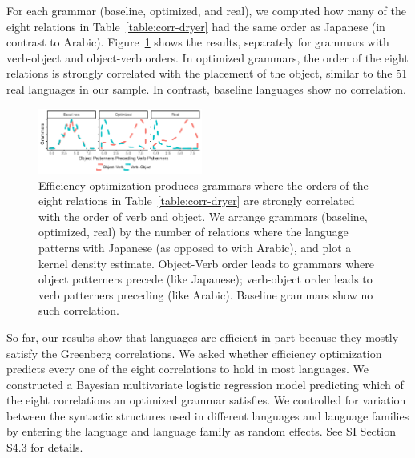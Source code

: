 \documentclass[9pt,twocolumn,twoside,lineno]{pnas-new}
\begin{document}
For each grammar (baseline, optimized, and real), we computed how many of the eight relations in Table~\ref{table:corr-dryer} had the same order as  Japanese (in contrast to Arabic).
Figure~\ref{fig:joint} shows the results, separately for grammars with verb-object and object-verb orders.
In optimized grammars, the order of the eight relations is strongly correlated with the placement of the object, similar to the 51 real languages in our sample.
In contrast, baseline languages show no correlation.


\begin{figure}
    \centering
    \includegraphics[width=0.48\textwidth]{../results/correlations/figures/correlations-curve-whiteaxis.pdf}
    \caption{
    Efficiency optimization produces grammars where the orders of the eight relations in Table~\ref{table:corr-dryer} are strongly correlated with the order of verb and object. We arrange grammars (baseline, optimized, real) by the number of relations where the language patterns with Japanese (as opposed to with Arabic), and plot a kernel density estimate. Object-Verb order leads to grammars where object patterners precede (like Japanese); verb-object order leads to verb patterners preceding (like Arabic). Baseline grammars show no such correlation.
    }
    \label{fig:joint}
\end{figure}




So far, our results show that languages are efficient in part because they mostly satisfy the Greenberg correlations.
We asked whether efficiency optimization predicts every one of the eight correlations to hold in most languages.
We constructed a Bayesian multivariate logistic regression model predicting which of the eight correlations an optimized grammar satisfies.
We controlled for variation between the syntactic structures used in different languages and language families by entering the language and language family as random effects.
See SI Section S4.3 for details.
\end{document}
